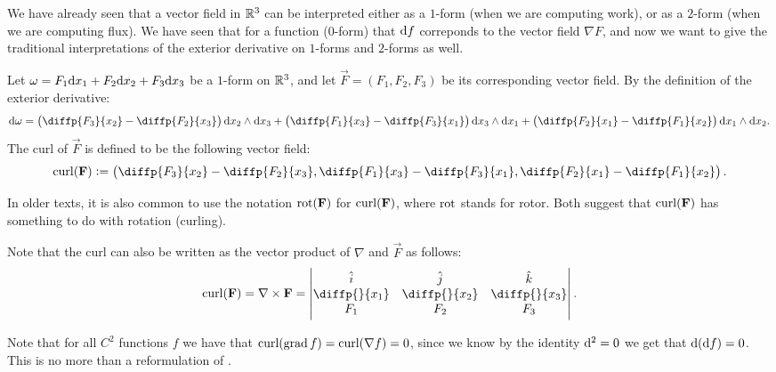 \documentclass[11pt,a4paper]{article}
\begin{document}
We have already seen that a vector field in $\mathbb{R}^3$ can be interpreted
either as a $1$-form (when we are computing work),
or as a $2$-form (when we are computing flux).
We have seen that for a function ($0$-form)
that $\mathrm{d} f$ correponds to the vector field $\nabla F$,
and now we want to give the traditional interpretations of the exterior
derivative on $1$-forms and $2$-forms as well.

\begin{definition}[Curl]
  \label{def:curl}
  Let $\omega = F_1 \dx_1 + F_2 \dx_2 + F_3 \dx_3$ be a $1$-form
  on $\mathbb{R}^3$,
  and let $\vec F = (F_1,F_2,F_3)$ be its corresponding vector field.
  By the definition of the exterior derivative:
  \[
    \dif \omega =
    \del{\diffp{{F_3}}{{x_2}} - \diffp{{F_2}}{{x_3}}} \dx_2 \wedge \dx_3 +
    \del{\diffp{{F_1}}{{x_3}} - \diffp{{F_3}}{{x_1}}} \dx_3 \wedge \dx_1 +
    \del{\diffp{{F_2}}{{x_1}} - \diffp{{F_1}}{{x_2}}} \dx_1 \wedge \dx_2.
  \]
  The curl of $\vec F$ is defined to be the following vector field:
  \[
    \curl (\vec F) :=
    \left(
    \diffp{{F_3}}{{x_2}} - \diffp{{F_2}}{{x_3}},
    \diffp{{F_1}}{{x_3}} - \diffp{{F_3}}{{x_1}},
    \diffp{{F_2}}{{x_1}} - \diffp{{F_1}}{{x_2}}
    \right).
  \]
\end{definition}
\begin{remark}
  In older texts, it is also common to use the notation
  $\operatorname{rot}(\boldsymbol{\mathbf{F}})$ for $\operatorname{curl}(\boldsymbol{\mathbf{F}})$, where $\operatorname{rot}$ stands for rotor.
  Both suggest that $\operatorname{curl}(\boldsymbol{\mathbf{F}})$ has something to do with rotation
  (curling).
\end{remark}
\begin{remark}
  Note that the curl can also be written as
  the vector product of $\nabla$ and $\vec F$ as follows:
  \renewcommand{\arraystretch}{1.5}
  \[
    \curl(\vec F) = \nabla \times \vec F =
    \begin{vmatrix}
      \hat i & \hat j & \hat k \\
      \diffp{}{{x_1}} & \diffp{}{{x_2}} &\diffp{}{{x_3}} \\
      F_1 & F_2 & F_3
    \end{vmatrix}.
  \]
\end{remark}

\begin{remark}
  \label{rmk:curl-grad}
  Note that for all $C^2$ functions $f$ we have that
  $\operatorname{curl}(\operatorname{grad} f) = \operatorname{curl}(\nabla f) = 0$,
  since we know by the identity $\mathrm{d}^2 = 0$ we get
  that $\mathrm{d}(\mathrm{d} f) = 0$.
  This is no more than a reformulation of
  .
\end{remark}
\end{document}
